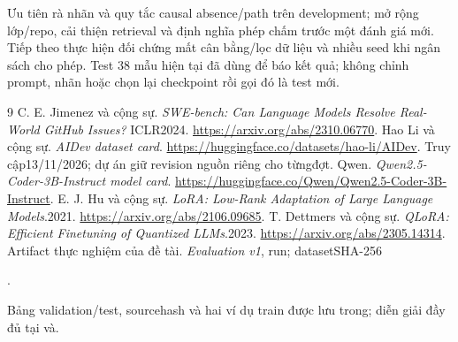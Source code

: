\documentclass[12pt,a4paper]{article}
\begin{document}
Ưu tiên rà nhãn và quy tắc causal absence/path trên development; mở rộng lớp/repo, cải thiện retrieval và định nghĩa phép chấm trước một đánh giá mới. Tiếp theo thực hiện đối chứng mất cân bằng/lọc dữ liệu và nhiều seed khi ngân sách cho phép. Test 38 mẫu hiện tại đã dùng để báo kết quả; không chỉnh prompt, nhãn hoặc chọn lại checkpoint rồi gọi đó là test mới.

\clearpage
\begin{thebibliography}{9}
 C. E. Jimenez và cộng sự. \textit{SWE-bench: Can Language Models Resolve Real-World GitHub Issues?} ICLR2024. \url{https://arxiv.org/abs/2310.06770}.
 Hao Li và cộng sự. \textit{AIDev dataset card}. \url{https://huggingface.co/datasets/hao-li/AIDev}. Truy cập13/11/2026; dự án giữ revision nguồn riêng cho từngđợt.
 Qwen. \textit{Qwen2.5-Coder-3B-Instruct model card}. \url{https://huggingface.co/Qwen/Qwen2.5-Coder-3B-Instruct}.
 E. J. Hu và cộng sự. \textit{LoRA: Low-Rank Adaptation of Large Language Models}.2021. \url{https://arxiv.org/abs/2106.09685}.
 T. Dettmers và cộng sự. \textit{QLoRA: Efficient Finetuning of Quantized LLMs}.2023. \url{https://arxiv.org/abs/2305.14314}.
 Artifact thực nghiệm của đề tài. \textit{Evaluation v1}, run; datasetSHA-256\par{}.\par Bảng validation/test, sourcehash và hai ví dụ train được lưu trong; diễn giải đầy đủ tại và.
\end{thebibliography}
\end{document}
